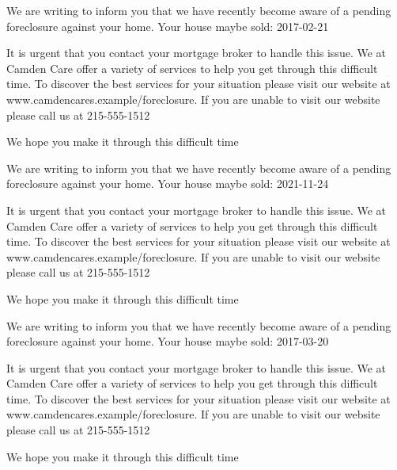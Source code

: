 \documentclass[10pt,stdletter]{newlfm}
\begin{document}
\pagebreak
{}
\begin{newlfm}

We are writing to inform you that we have recently become aware of a pending foreclosure against your home. Your house maybe sold: 2017-02-21

It is urgent that you contact your mortgage broker to handle this issue.
We at Camden Care offer a variety of services to help you get through this difficult time. To discover the best services for your situation please visit our website at www.camdencares.example/foreclosure.
If you are unable to visit our website please call us at 215-555-1512

We hope you make it through this difficult time

\end{newlfm}
\pagebreak
{}
\begin{newlfm}

We are writing to inform you that we have recently become aware of a pending foreclosure against your home. Your house maybe sold: 2021-11-24

It is urgent that you contact your mortgage broker to handle this issue.
We at Camden Care offer a variety of services to help you get through this difficult time. To discover the best services for your situation please visit our website at www.camdencares.example/foreclosure.
If you are unable to visit our website please call us at 215-555-1512

We hope you make it through this difficult time

\end{newlfm}
\pagebreak
{}
\begin{newlfm}

We are writing to inform you that we have recently become aware of a pending foreclosure against your home. Your house maybe sold: 2017-03-20

It is urgent that you contact your mortgage broker to handle this issue.
We at Camden Care offer a variety of services to help you get through this difficult time. To discover the best services for your situation please visit our website at www.camdencares.example/foreclosure.
If you are unable to visit our website please call us at 215-555-1512

We hope you make it through this difficult time

\end{newlfm}
\end{document}
